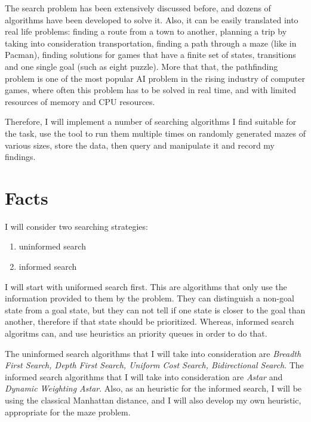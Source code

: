 \documentclass[a4paper,12pt]{report}
\begin{document}
The search problem has been extensively discussed before, and dozens of algorithms have been developed to solve it. Also, it can be easily translated into real life problems: finding a route from a town to another, planning a trip by taking into consideration transportation, finding a path through a maze (like in Pacman), finding solutions for games that have a finite set of states, transitions and one single goal (such as eight puzzle). More that that, the pathfinding problem is one of the most popular AI problem in the rising industry of computer games, where often this problem has to be solved in real time, and with limited resources of memory and CPU resources. \cite{wiki:05}

Therefore, I will implement a number of searching algorithms I find suitable for the task, use the tool to run them multiple times on randomly generated mazes of various sizes, store the data, then query and manipulate it and record my findings.

\section{Facts}
I will consider two searching strategies:
\begin{enumerate}
	\item uninformed search
	\item informed search
\end{enumerate}

I will start with uniformed search first. This are algorithms that only use the information provided to them by the problem. They can distinguish a non-goal state from a goal state, but they can not tell if one state is closer to the goal than another, therefore if that state should be prioritized. Whereas, informed search algoritms can, and use heuristics an priority queues in order to do that. \cite{russell2016artificial}

The uninformed search algorithms that I will take into consideration are \textit{Breadth First Search, Depth First Search, Uniform Cost Search, Bidirectional Search}. The informed search algorithms that I will take into consideration are \textit{Astar} and \textit{Dynamic Weighting Astar}. Also, as an heuristic for the informed search, I will be using the classical Manhattan distance, and I will also develop my own heuristic, appropriate for the maze problem.
\end{document}
